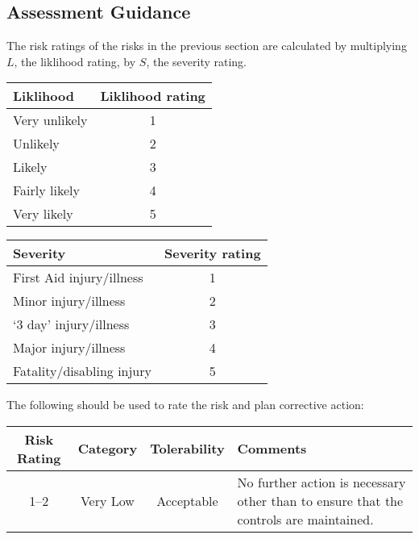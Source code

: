 \documentclass[12pt,a4paper]{scrartcl}
\begin{document}
\begin{landscape}

\section{Assessment Guidance}

The risk ratings of the risks in the previous section are calculated by multiplying $L$, the liklihood rating, by $S$, the severity rating.

\bigskip
\begin{minipage}[b]{0.5\linewidth}
\begin{tabular}[c]{lc}
  \toprule
  \textbf{Liklihood} & \textbf{Liklihood rating} \\
  \midrule
  Very unlikely & 1 \\
  Unlikely & 2 \\
  Likely & 3 \\
  Fairly likely & 4 \\
  Very likely & 5 \\
  \bottomrule
\end{tabular}
\end{minipage}
\begin{minipage}[b]{0.5\linewidth}
\begin{tabular}[c]{lc}
  \toprule
  \textbf{Severity} & \textbf{Severity rating} \\
  \midrule
  First Aid injury/illness & 1 \\
  Minor injury/illness & 2 \\
  `3 day' injury/illness & 3 \\
  Major injury/illness & 4 \\
  Fatality/disabling injury & 5 \\
  \bottomrule
\end{tabular}
\end{minipage}
\bigskip

The following should be used to rate the risk and plan corrective action:
\bigskip
\newcommand{\riskinfo}[4]{
  #1 & #2 & #3 & #4 \\
}

\begin{tabular*}{\linewidth}[c]{cccp{33em}}
  \toprule
  \textbf{Risk Rating} & \textbf{Category} & \textbf{Tolerability} & \textbf{Comments} \\
  \midrule

  \riskinfo{1--2}{Very Low}{Acceptable}
  {No further action is necessary other than to ensure that the controls are maintained.}


\end{tabular*}
\end{landscape}
\end{document}
